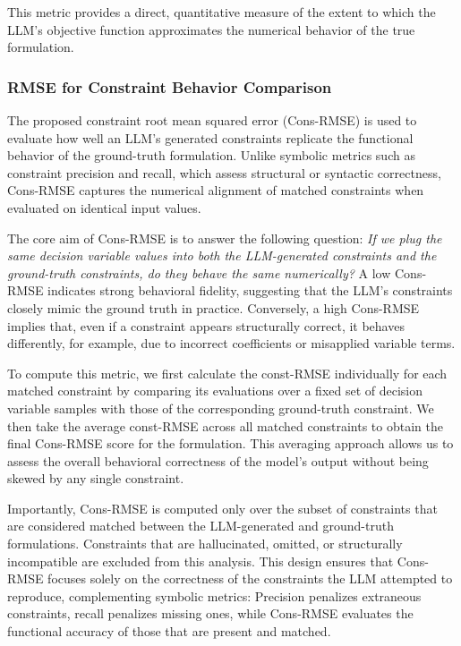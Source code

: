 \documentclass[review,12pt]{elsarticle}
\begin{document}
This metric provides a direct, quantitative measure of the extent to which the LLM's objective function approximates the numerical behavior of the true formulation. 

\vspace{-3mm}
\subsubsection{RMSE for Constraint Behavior Comparison}\label{cons-rmse}

The proposed constraint root mean squared error (Cons-RMSE) is used to evaluate how well an LLM’s generated constraints replicate the functional behavior of the ground-truth formulation. Unlike symbolic metrics such as constraint precision and recall, which assess structural or syntactic correctness, Cons-RMSE captures the numerical alignment of matched constraints when evaluated on identical input values.

The core aim of Cons-RMSE is to answer the following question: \textit{If we plug the same decision variable values into both the LLM-generated constraints and the ground-truth constraints, do they behave the same numerically?} A low Cons-RMSE indicates strong behavioral fidelity, suggesting that the LLM’s constraints closely mimic the ground truth in practice. Conversely, a high Cons-RMSE implies that, even if a constraint appears structurally correct, it behaves differently, for example, due to incorrect coefficients or misapplied variable terms.

To compute this metric, we first calculate the const-RMSE individually for each matched constraint by comparing its evaluations over a fixed set of decision variable samples with those of the corresponding ground-truth constraint. We then take the average const-RMSE across all matched constraints to obtain the final Cons-RMSE score for the formulation. This averaging approach allows us to assess the overall behavioral correctness of the model’s output without being skewed by any single constraint.

Importantly, Cons-RMSE is computed only over the subset of constraints that are considered matched between the LLM-generated and ground-truth formulations. Constraints that are hallucinated, omitted, or structurally incompatible are excluded from this analysis. This design ensures that Cons-RMSE focuses solely on the correctness of the constraints the LLM attempted to reproduce, complementing symbolic metrics: Precision penalizes extraneous constraints, recall penalizes missing ones, while Cons-RMSE evaluates the functional accuracy of those that are present and matched.
\end{document}

